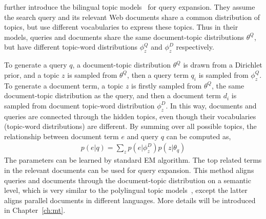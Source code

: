 \cite{Gao-2012} further introduce the bilingual topic
models~\citep{Gao-2011} for query expansion. They assume the search
query and its relevant Web documents share a common distribution of
topics, but use different vocabularies to express these topics. Thus
in their models, queries and documents share the same document-topic
distributions $\theta^Q$, but have different topic-word distributions
$\phi_z^Q$ and $\phi_z^D$ respectively.

To generate a query $q$, a document-topic distribution $\theta^Q$ is
drawn from a Dirichlet prior, and a topic $z$ is sampled from
$\theta^Q$, then a query term $q_i$ is sampled from $\phi_z^Q$. To
generate a document term, a topic $z$ is firstly sampled from
$\theta^Q$, the same document-topic distribution as the query, and
then a document term $d_i$ is sampled from document topic-word
distribution $\phi_z^D$. In this way, documents and queries are
connected through the hidden topics, even though their vocabularies
(topic-word distributions) are different. By summing over all possible
topics, the relationship between document term $e$ and query $q$ can
be computed as,
\begin{align}
p(e|q) = \sum_z p(e|\phi_z^D) p(z | \theta_q)
\end{align}
The parameters can be learned by standard EM algorithm. The top related
terms in the relevant documents can be used for query expansion. This
method aligns queries and documents through the document-topic
distribution on a semantic level, which is very similar to the
polylingual topic models~\citep{mimno-09}, except the latter aligns
parallel documents in different languages. More details will be
introduced in Chapter~\ref{ch:mt}.

